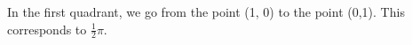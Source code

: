 \documentclass[preview]{standalone}
\begin{document}
\begin{center}
In the first quadrant, we go from the point (1, 0) to the point (0,1). This corresponds to $\frac{1}{2} \pi$.
\end{center}
\end{document}

